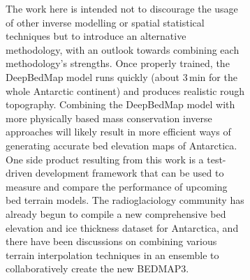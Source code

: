 \documentclass[tc, noline]{copernicus}
\begin{document}
\begin{figure}[t]
\begin{figure}[t]
The work here is intended not to discourage the usage of other inverse modelling or spatial statistical techniques but to introduce an alternative methodology, with an outlook towards combining each methodology's strengths.
Once properly trained, the DeepBedMap model runs quickly (about 3\,min for the whole Antarctic continent) and produces realistic rough topography.
Combining the DeepBedMap model with more physically based mass conservation inverse approaches \citep[e.g.][]{MorlighemDeepglacialtroughs2019} will likely result in more efficient ways of generating accurate bed elevation maps of Antarctica.
One side product resulting from this work is a test-driven development framework that can be used to measure and compare the performance of upcoming bed terrain models.
The radioglaciology community has already begun to compile a new comprehensive bed elevation and ice thickness dataset for Antarctica, and there have been discussions on combining various terrain interpolation techniques in an ensemble to collaboratively create the new BEDMAP3.



\hack{\clearpage}





\end{figure}
\end{figure}
\end{document}
